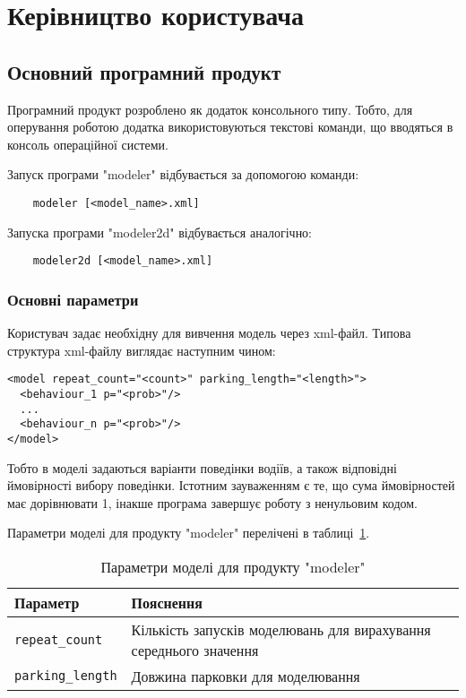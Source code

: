 \section{Керівництво користувача}
\jointitles

\subsection{Основний програмний продукт}

Програмний продукт розроблено як додаток консольного типу. Тобто, для оперування роботою додатка використовуються текстові команди, що вводяться в консоль операційної системи.

Запуск програми "modeler" відбувається за допомогою команди:
\begin{verbatim}
	modeler [<model_name>.xml]
\end{verbatim}

Запуска програми "modeler2d" відбувається аналогічно:

\begin{verbatim}
	modeler2d [<model_name>.xml]
\end{verbatim}

\subsubsection{Основні параметри}

Користувач задає необхідну для вивчення модель через xml-файл. Типова структура xml-файлу виглядає наступним чином:
\begin{verbatim}
<model repeat_count="<count>" parking_length="<length>">
  <behaviour_1 p="<prob>"/>
  ...
  <behaviour_n p="<prob>"/>
</model>
\end{verbatim}

Тобто в моделі задаються варіанти поведінки водіїв, а також відповідні ймовірності вибору поведінки. Істотним зауваженням є те, що сума ймовірностей має дорівнювати 1, інакше програма завершує роботу з ненульовим кодом.

Параметри моделі для продукту "modeler" перелічені в таблиці~\ref{tab:modeler_model_params}.

\begin{table}[ht]
	\caption{Параметри моделі для продукту "modeler"}
	\centering
\begin{tabular}{|p{}|p{}|}
	\hline
	Параметр & Пояснення \\
	\hline
	\verb!repeat_count! & Кількість запусків моделювань для вирахування середнього значення \\
	\hline
	\verb!parking_length! & Довжина парковки для моделювання \\
	\hline
\end{tabular}	
	\label{tab:modeler_model_params}
\end{table}

